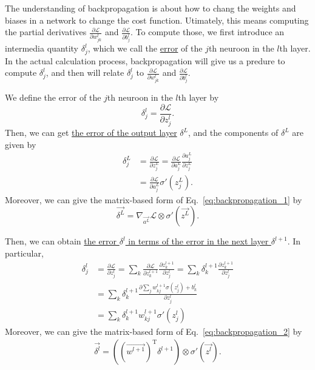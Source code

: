 \documentclass[10pt,onecolumn]{book}
\begin{document}
The understanding of backpropagation is about how to chang the weights and biases in a network to change the cost function. Utimately, this means computing the partial derivatives $\frac{\partial \mathcal{L}}{\partial w^l_{jk}} $ and $\frac{\partial \mathcal{L}}{\partial b^l_j} $. To compute those, we first introduce an intermedia quantity $\delta^l_j$, which we call the \uline{error} of the $j$th neuroon in the $l$th layer. In the actual calculation process, backpropagation will give us a predure to compute $\delta^l_j$, and then will relate $\delta^l_j$ to $\frac{\partial \mathcal{L}}{\partial w^l_{jk}} $ and $\frac{\partial \mathcal{L}}{\partial b^l_j} $.

We define the error of the $j$th neuroon in the $l$th layer by
\begin{equation}
\delta^l_j = \frac{\partial \mathcal{L}}{\partial z^l_j}.
\end{equation}
Then, we can get \uline{the error of the output layer} $\delta^L$, and the components of $\delta^L$ are given by
\begin{equation}\label{eq:backpropagation_1}
\begin{split}
\delta^L_j & = \frac{\partial \mathcal{L}}{\partial z^L_j} 
		   = \frac{\partial \mathcal{L}}{\partial a^L_j}\frac{\partial a^L_j}{\partial z^L_j} \\
		   & = \frac{\partial \mathcal{L}}{\partial a^L_j} \sigma'(z^L_j).
\end{split}
\tag{BP1}
\end{equation}
Moreover, we can give the matrix-based form of Eq.~\ref{eq:backpropagation_1} by
\begin{equation}
\overrightarrow{\delta^L} = \nabla_{\overrightarrow{a^L}}\mathcal{L} \otimes \sigma'(\overrightarrow{z^L}).
\end{equation}

Then, we can obtain \uline{the error $\delta^l$ in terms of the error in the next layer $\delta^{l+1}$}. In particular, 
\begin{equation}\label{eq:backpropagation_2}
\begin{split}
\delta^l_j & = \frac{\partial \mathcal{L}}{\partial z^l_j} 
		    = \sum_k \frac{\partial \mathcal{L}}{\partial z^{l+1}_k} \frac{\partial z^{l+1}_k}{\partial z^l_j}
		    = \sum_k \delta^{l+1}_k \frac{\partial z^{l+1}_k}{\partial z^l_j} \\
		   & = \sum_k \delta^{l+1}_k \frac{\partial \sum_j w^{l+1}_{kj} \sigma(z^l_j) + b^l_k}{\partial z^l_j} \\
		   & = \sum_k \delta^{l+1}_k w^{l+1}_{kj} \sigma'(z^l_j)
\end{split}
\tag{BP2}
\end{equation}
Moreover, we can give the matrix-based form of Eq.~\ref{eq:backpropagation_2} by
\begin{equation}
\begin{split}
\overrightarrow{\delta^l} = ((\overrightarrow{w^{l+1}})^\mathrm{T}\delta^{l+1}) \otimes \sigma'(\overrightarrow{z^l}).
\end{split}
\end{equation}
\end{document}

